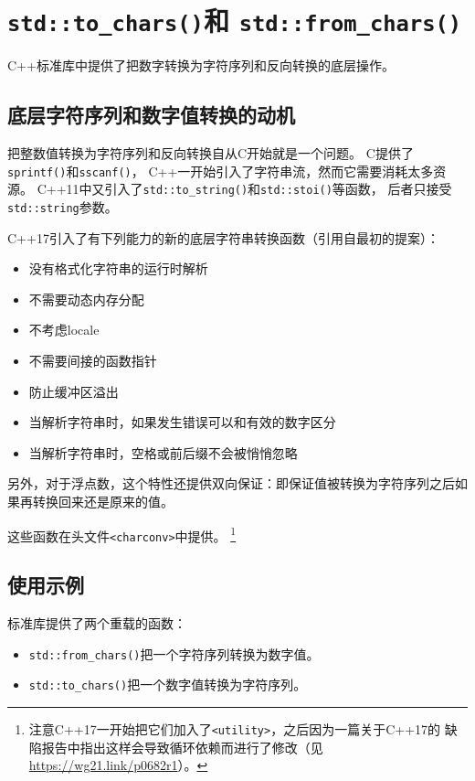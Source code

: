 \chapter{\texttt{std::to\_chars()}和
\texttt{std::from\_chars()}}\label{ch31}
C++标准库中提供了把数字转换为字符序列和反向转换的底层操作。


\section{底层字符序列和数字值转换的动机}
把整数值转换为字符序列和反向转换自从C开始就是一个问题。
C提供了\texttt{sprintf()}和\texttt{sscanf()}，
C++一开始引入了字符串流，然而它需要消耗太多资源。
C++11中又引入了\texttt{std::to\_string()}和\texttt{std::stoi()}等函数，
后者只接受\texttt{std::string}参数。

C++17引入了有下列能力的新的底层字符串转换函数（引用自最初的提案）：
\begin{itemize}
    \item 没有格式化字符串的运行时解析
    \item 不需要动态内存分配
    \item 不考虑locale
    \item 不需要间接的函数指针
    \item 防止缓冲区溢出
    \item 当解析字符串时，如果发生错误可以和有效的数字区分
    \item 当解析字符串时，空格或前后缀不会被悄悄忽略
\end{itemize}
另外，对于浮点数，这个特性还提供双向保证：即保证值被转换为字符序列之后如果再转换回来还是原来的值。

这些函数在头文件\texttt{<charconv>}中提供。
\footnote{注意C++17一开始把它们加入了\texttt{<utility>}，之后因为一篇关于C++17的
缺陷报告中指出这样会导致循环依赖而进行了修改（见\url{https://wg21.link/p0682r1}）。}


\section{使用示例}
标准库提供了两个重载的函数：
\begin{itemize}
    \item \texttt{std::from\_chars()}把一个字符序列转换为数字值。
    \item \texttt{std::to\_chars()}把一个数字值转换为字符序列。
\end{itemize}

